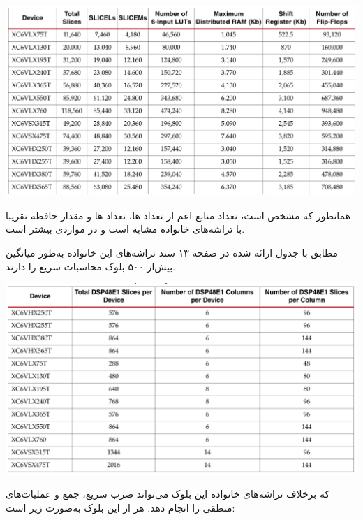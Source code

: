 \begin{qsolve}
	\begin{center}
		\includegraphics*[width=1\linewidth]{pics/img11.png}
		\label{منابع موجود در هر CLB}
	\end{center}
	
	همانطور که مشخص است، تعداد منابع اعم از تعداد ها، تعداد ها و مقدار حافظه تقریبا با تراشه‌های خانواده  مشابه است و در مواردی بیشتر است.
	
	
	مطابق با جدول ارائه شده در صفحه ۱۳ سند \cite{ref4} تراشه‌های این خانواده به‌طور میانگین بیش‌از ۵۰۰ بلوک محاسبات سریع  را دارند.
	
	
	\begin{center}
		\includegraphics*[width=1\linewidth]{pics/img12.png}
		\label{تعداد بلوک‌های DSP48 موجود در هر تراشه خانواده Virtex}
	\end{center}
	
	که برخلاف تراشه‌های خانواده  این بلوک می‌تواند ضرب سریع، جمع و عملیات‌های منطقی را انجام دهد. هر  از این بلوک به‌صورت زیر است:
\end{qsolve}


